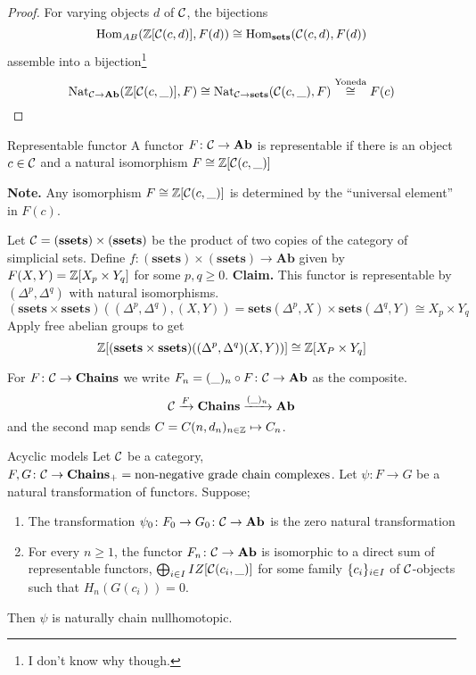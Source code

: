 \documentclass[language=english]{TemplateLecture}
\begin{document}
\begin{proof}
    For varying objects \(d\) of \(\mathcal{C}\), the bijections
    \[\operatorname{Hom}_{AB}(\mathbb{Z}[\mathcal{C}(c,d)], F(d)) \cong \operatorname{Hom}_{\mathbf{sets}}(\mathcal{C}(c,d), F(d))\]
    assemble into a bijection\footnote{I don't know why though.}
    \[\mathrm{Nat}_{\mathcal{C} \to \mathbf{Ab}}(\mathbb{Z}[\mathcal{C}(c, \_)], F) \cong \mathrm{Nat}_{\mathcal{C} \to \mathbf{sets}}(\mathcal{C}(c, \_), F) \overset{\text{Yoneda}}{\cong} F(c)\]
\end{proof}

\begin{defi}{Representable functor}{}
    A functor \(F\colon \mathcal{C} \to \mathbf{Ab}\) is representable if there is an object \(c \in \mathcal{C}\) and a natural isomorphism \(F\cong \mathbb{Z}[\mathcal{C}(c,\_)]\)
\end{defi}
\textbf{Note.} Any isomorphism \(F \cong \mathbb{Z}[\mathcal{C}(c,\_)]\) is determined by the \enquote{universal element} in \(F(c)\).

\begin{example}
    Let \(\mathcal{C} = (\mathbf{ssets}) \times (\mathbf{ssets})\) be the product of two copies of the category of simplicial sets. Define \(f\colon (\mathbf{ssets})\times (\mathbf{ssets}) \to \mathbf{Ab}\) given by \(F(X,Y) = \mathbb{Z}[X_p \times Y_q]\) for some \(p,q \geq 0\).
    \textbf{Claim.} This functor is representable by \((\Delta^p, \Delta^q)\) with natural isomorphisms.
    \[(\mathbf{ssets}\times \mathbf{ssets})((\Delta^p, \Delta^q), (X,Y)) = \mathbf{sets}(\Delta^p, X) \times \mathbf{sets}(\Delta^q,Y) \cong X_p \times Y_q\]
    Apply free abelian groups to get
    \[\mathbb{Z}[(\mathbf{ssets} \times \mathbf{ssets})((\Delta^p,\Delta^q)(X,Y))] \cong \mathbb{Z}[X_P \times Y_q]\]
\end{example}

\begin{notation}
    For \(F\colon \mathcal{C} \to \mathbf{Chains}\) we write \(F_n = (\_)_n \circ F\colon \mathcal{C} \to \mathbf{Ab}\) as the composite.
    \[\mathcal{C} \xrightarrow{F} \mathbf{Chains} \xrightarrow{(\_)_n} \mathbf{Ab}\]
    and the second map sends \(C = C(n, d_n)_{n \in \mathbb{Z}} \mapsto C_n\).
\end{notation}

\begin{thm}{Acyclic models}{}
    Let \(\mathcal{C}\) be a category, \(F,G\colon \mathcal{C} \to \mathbf{Chains}_+ = \text{non-negative grade chain complexes}\). Let \(\psi \colon F \to G\) be a natural transformation of functors. Suppose;
    \begin{enumerate}
        \item The transformation \(\psi_0 \colon F_0 \to G_0 \colon \mathcal{C} \to \mathbf{Ab}\) is the zero natural transformation
        \item For every \(n \geq 1\), the functor \(F_n \colon \mathcal{C} \to \mathbf{Ab}\) is isomorphic to a direct sum of representable functors, \(\bigoplus_{i \in I} IZ[\mathcal{C}(c_i,\_)]\) for some family \(\{c_i\}_{i \in I}\) of \(\mathcal{C}\)-objects such that \(H_n(G(c_i)) = 0\).
    \end{enumerate}
    Then \(\psi\) is naturally chain nullhomotopic.
\end{thm}
\end{document}
